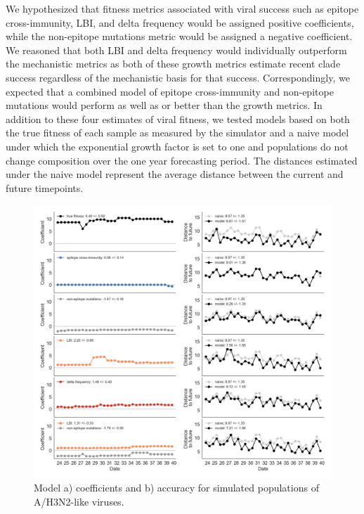 We hypothesized that fitness metrics associated with viral success such as epitope cross-immunity, LBI, and delta frequency would be assigned positive coefficients, while the non-epitope mutations metric would be assigned a negative coefficient.
We reasoned that both LBI and delta frequency would individually outperform the mechanistic metrics as both of these growth metrics estimate recent clade success regardless of the mechanistic basis for that success.
Correspondingly, we expected that a combined model of epitope cross-immunity and non-epitope mutations would perform as well as or better than the growth metrics.
In addition to these four estimates of viral fitness, we tested models based on both the true fitness of each sample as measured by the simulator and a naive model under which the exponential growth factor is set to one and populations do not change composition over the one year forecasting period.
The distances estimated under the naive model represent the average distance between the current and future timepoints.

\begin{figure}[ht]
  \begin{center}
  \includegraphics[width=\textwidth]{figures/unadjusted-model-accuracy-and-coefficients-for-simulated-populations.png}
  \caption{Model a) coefficients and b) accuracy for simulated populations of A/H3N2-like viruses.}
  \label{fig:unadjusted_model_accuracy_and_coefficients_for_simulated_populations}
  \end{center}
\end{figure}

